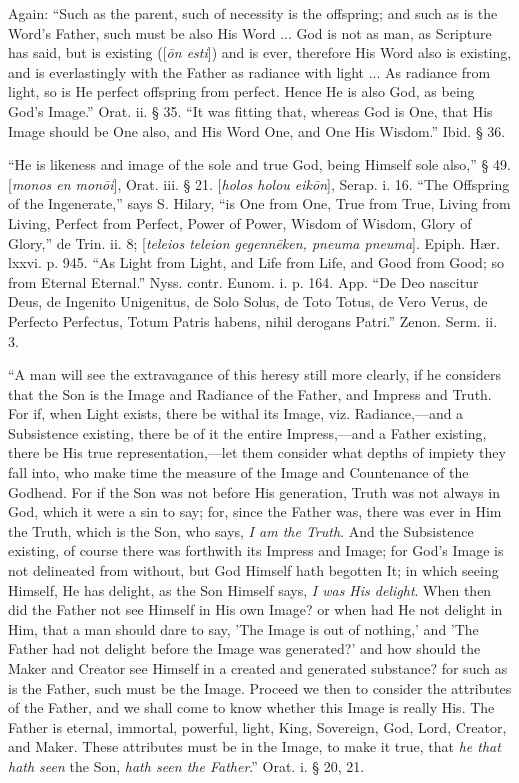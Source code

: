 Again: ``Such as the parent, such of necessity
is the offspring; and such as is the Word's Father, such must be
also His Word ... God is not as man, as Scripture has said, but is
existing ([\emph{\={o}n esti}]) and is ever, therefore His Word
also is existing, and is everlastingly with the Father as radiance
with light ... As radiance from light, so is He perfect offspring from
perfect. Hence He is also God, as being God's Image.'' Orat. ii. §
35. ``It was fitting that, whereas God is One, that His Image should
be One also, and His Word One, and One His Wisdom.'' Ibid. § 36.

``He is likeness and image of the sole and true
God, being Himself sole also,'' § 49. [\emph{monos en mon\={o}i}], Orat.
iii. § 21. [\emph{holos holou eik\={o}n}], Serap. i. 16. ``The
Offspring of the Ingenerate,'' says S. Hilary, ``is One from One,
True from True, Living from Living, Perfect from Perfect, Power of
Power, Wisdom of Wisdom, Glory of Glory,'' de Trin. ii. 8; [\emph{teleios
teleion gegenn\={e}ken, pneuma pneuma}]. Epiph. Hær. lxxvi. p.
945. ``As Light from Light, and Life from Life, and Good from Good;
so from Eternal Eternal.'' Nyss. contr. Eunom. i. p. 164. App. ``De
Deo nascitur Deus, de Ingenito Unigenitus, de Solo Solus, de Toto
Totus, de Vero Verus, de Perfecto Perfectus, Totum Patris habens,
nihil derogans Patri.'' Zenon. Serm. ii. 3.

``A man will see the extravagance of this heresy
still more clearly, if he considers that the Son is the Image and
Radiance of the Father, and Impress and Truth. For if, when Light
exists, there be withal its Image, viz. Radiance,—and a
Subsistence existing, there be of it the entire Impress,—and a
Father existing, there be His true representation,—let them consider
what depths of impiety they fall into, who make time the measure of
the Image and Countenance of the Godhead. For if the Son was not
before His generation, Truth was not always in God, which it were a
sin to say; for, since the Father was, there was ever in Him the
Truth, which is the Son, who says, \emph{I am the Truth}. And the
Subsistence existing, of course there was forthwith its Impress and
Image; for God's Image is not delineated from without, but God
Himself hath begotten It; in which seeing Himself, He has delight, as
the Son Himself says, \emph{I was His delight}. When then did the
Father not see Himself in His own Image? or when had He not delight in
Him, that a man should dare to say, 'The Image is out of nothing,' and
'The Father had not delight before the Image was generated?' and how
should the Maker and Creator see Himself in a created and generated
substance? for such as is the Father, such must be the Image. Proceed
we then to consider the attributes of the Father, and we shall come to
know whether this Image is really His. The Father is eternal,
immortal, powerful, light, King, Sovereign, God, Lord, Creator, and
Maker. These attributes must be in the Image, to make it true, that \emph{he
that hath seen} the Son, \emph{hath seen the Father}.'' Orat. i.
§ 20, 21.

